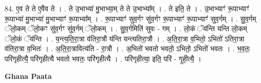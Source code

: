 \documentclass[17pt]{extarticle}
\begin{document}
84. ए॒व ते ते ए॒वैव ते । . ते उ॒भाभ्या॑ मु॒भाभ्या॒म् ते ते उ॒भाभ्या᳚म् । . ते इति॒ ते । . उ॒भाभ्याꣳ॑ रू॒पाभ्याꣳ॑ रू॒पाभ्या॑ मु॒भाभ्या॑ मु॒भाभ्याꣳ॑ रू॒पाभ्या᳚म् । . रू॒पाभ्याꣳ॑ सुव॒र्गꣳ सु॑व॒र्गꣳ रू॒पाभ्याꣳ॑ रू॒पाभ्याꣳ॑ सुव॒र्गम् । . सु॒व॒र्गम् ॅलो॒कम् ॅलो॒कꣳ सु॑व॒र्गꣳ सु॑व॒र्गम् ॅलो॒कम् । . सु॒व॒र्गमिति॑ सुवः - गम् । . लो॒कं ॅय॑न्ति यन्ति लो॒कम् ॅलो॒कं ॅय॑न्ति । . य॒न्त्य॒ति॒रा॒त्रा व॑तिरा॒त्रौ य॑न्ति यन्त्यतिरा॒त्रौ । . अ॒ति॒रा॒त्रा व॒भितो॒ ऽभितो॑ ऽतिरा॒त्रा व॑तिरा॒त्रा व॒भितः॑ । . अ॒ति॒रा॒त्रावित्य॑ति - रा॒त्रौ । . अ॒भितो॑ भवतो भवतो॒ ऽभितो॒ ऽभितो॑ भवतः । . भ॒व॒तः॒ परि॑गृहीत्यै॒ परि॑गृहीत्यै भवतो भवतः॒ परि॑गृहीत्यै । . परि॑गृहीत्या॒ इति॒ परि॑ - गृ॒ही॒त्यै॒ । \newline

\textbf{Ghana Paata } \newline
\end{document}
